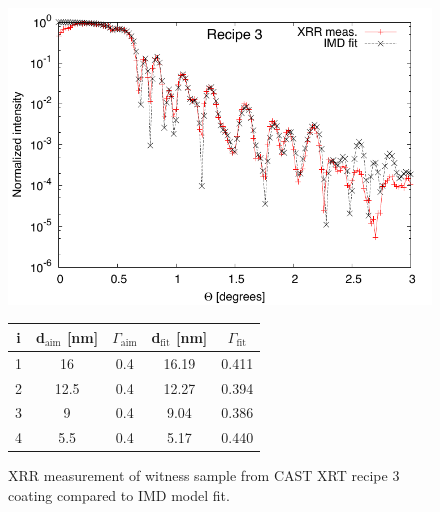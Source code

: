 \begin{figure}[h!]
\centering
\begin{minipage}{.47\textwidth}
  \centering
  \includegraphics[width=\linewidth]{figures/cast/cast_recipe3_fit.pdf}
\end{minipage}%
\begin{minipage}{.53\textwidth}
  \centering
  \footnotesize
\begin{tabular}{c|c|c|c|c}
i&d$_{\text{aim}}$ [nm]&$\Gamma_{\text{aim}}$&d$_{\text{fit}}$ [nm]&$\Gamma_{\text{fit}}$\\
\hline
1&16&0.4&16.19&0.411\\
2&12.5&0.4&12.27&0.394\\
3&9&0.4&9.04&0.386\\
4&5.5&0.4&5.17&0.440
\end{tabular}
\end{minipage}
\caption{\footnotesize XRR measurement of witness sample from CAST XRT recipe 3 coating compared to IMD model fit.}\label{fig:cast_fit_rec3}
\end{figure}


